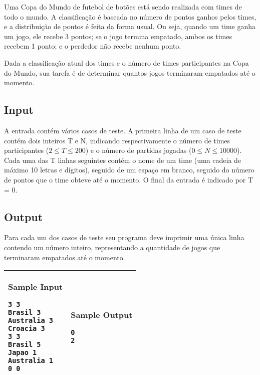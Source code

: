 Uma Copa do Mundo de futebol de botões está sendo realizada com times de todo o mundo.
A classificação é baseada no número de pontos ganhos pelos times, e a distribuição de pontos
é feita da forma usual. Ou seja, quando um time ganha um jogo, ele recebe 3 pontos; se o jogo
termina empatado, ambos os times recebem 1 ponto; e o perdedor não recebe nenhum ponto.

Dada a classificação atual dos times e o número de times participantes na Copa do Mundo,
sua tarefa é de determinar quantos jogos terminaram empatados até o momento.

\subsection*{Input}

A entrada contém vários casos de teste. A primeira linha de um caso de teste contém dois
inteiros T e N, indicando respectivamente o número de times participantes ($2 \le T \le 200$) e
o número de partidas jogadas ($0 \le N \le 10000$). Cada uma das T linhas seguintes contém o
nome de um time (uma cadeia de máximo 10 letras e dígitos), seguido de um espaço em branco,
seguido do número de pontos que o time obteve até o momento. O final da entrada é indicado
por T = 0.

\subsection*{Output}

Para cada um dos casos de teste seu programa deve imprimir uma única linha contendo um
número inteiro, representando a quantidade de jogos que terminaram empatados até o momento.

\begin{table}[!h]
\centering
\begin{tabular}{|l|l|}
\hline
\begin{minipage}[t]{3in}
\textbf{Sample Input}
\begin{verbatim}
3 3
Brasil 3
Australia 3
Croacia 3
3 3
Brasil 5
Japao 1
Australia 1
0 0
\end{verbatim}
\vspace{1mm}
\end{minipage}
&

\begin{minipage}[t]{3in}
\textbf{Sample Output}
\begin{verbatim}
0
2
\end{verbatim}
\vspace{1mm}
\end{minipage} \\
\hline
\end{tabular}
\end{table}

\newpage
